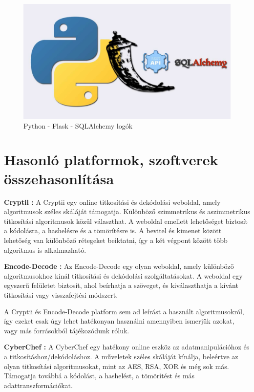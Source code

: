 \pagebreak
\begin{figure}[!h]
	\centering
	\includegraphics[scale=0.15]{images/logoPythonFlaskSqlalchemy}
	\caption{Python - Flask - SQLAlchemy logók}
\end{figure}


\section {Hasonló platformok, szoftverek összehasonlítása}

\textbf{Cryptii \cite{Cryi}:} A Cryptii egy online titkosítási és dekódolási weboldal, amely algoritmusok széles skáláját támogatja. Különböző szimmetrikus és aszimmetrikus titkosítási algoritmusok közül választhat. A weboldal emellett lehetőséget biztosít a kódolásra, a hashelésre és a tömörítésre is. A bevitel és kimenet között lehetőség van különböző rétegeket beiktatni, így a két végpont között több algoritmus is alkalmazható.

\textbf{Encode-Decode \cite{EnDe}:} Az Encode-Decode egy olyan weboldal, amely különböző algoritmusokhoz kínál titkosítási és dekódolási szolgáltatásokat. A weboldal egy egyszerű felületet biztosít, ahol beírhatja a szöveget, és kiválaszthatja a kívánt titkosítási vagy visszafejtési módszert.

A Cryptii és Encode-Decode platform sem ad leírást a használt algoritmusokról, így ezeket csak úgy lehet hatékonyan használni amennyiben ismerjük azokat, vagy más forrásokból tájékozódunk róluk.

\vspace{10pt}
\textbf{CyberChef \cite{CyCh}:} A CyberChef egy hatékony online eszköz az adatmanipulációhoz és a titkosításhoz/dekódoláshoz. A műveletek széles skáláját kínálja, beleértve az olyan titkosítási algoritmusokat, mint az AES, RSA, XOR és még sok más. Támogatja továbbá a kódolást, a hashelést, a tömörítést és más adattranszformációkat.

